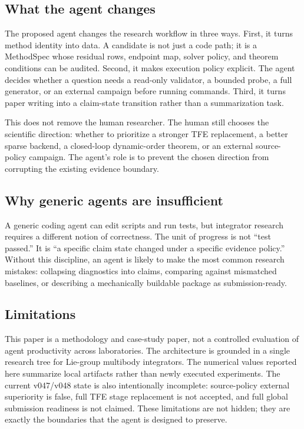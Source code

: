 \documentclass[10pt]{article}
\begin{document}
\subsection{What the agent changes}

The proposed agent changes the research workflow in three ways. First, it
turns method identity into data. A candidate is not just a code path; it is a
MethodSpec whose residual rows, endpoint map, solver policy, and theorem
conditions can be audited. Second, it makes execution policy explicit. The
agent decides whether a question needs a read-only validator, a bounded probe,
a full generator, or an external campaign before running commands. Third, it
turns paper writing into a claim-state transition rather than a summarization
task.

This does not remove the human researcher. The human still chooses the
scientific direction: whether to prioritize a stronger TFE replacement, a
better sparse backend, a closed-loop dynamic-order theorem, or an external
source-policy campaign. The agent's role is to prevent the chosen direction
from corrupting the existing evidence boundary.

\subsection{Why generic agents are insufficient}

A generic coding agent can edit scripts and run tests, but integrator research
requires a different notion of correctness. The unit of progress is not
``test passed.'' It is ``a specific claim state changed under a specific
evidence policy.'' Without this discipline, an agent is likely to make the
most common research mistakes: collapsing diagnostics into claims, comparing
against mismatched baselines, or describing a mechanically buildable package as
submission-ready.

\subsection{Limitations}

This paper is a methodology and case-study paper, not a controlled evaluation
of agent productivity across laboratories. The architecture is grounded in a
single research tree for Lie-group multibody integrators. The numerical values
reported here summarize local artifacts rather than newly executed
experiments. The current v047/v048 state is also intentionally incomplete:
source-policy external superiority is false, full TFE stage replacement is not
accepted, and full global submission readiness is not claimed. These
limitations are not hidden; they are exactly the boundaries that the agent is
designed to preserve.
\end{document}
